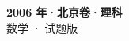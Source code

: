 \documentclass[zihao=-4, a4paper]{ctexart}
\begin{document}
\begin{center}
  {\Large\bfseries 2006 年·北京卷·理科}\\[4pt]
  {\large 数学 · 试题版}
\end{center}
\medskip
{}

\end{document}

